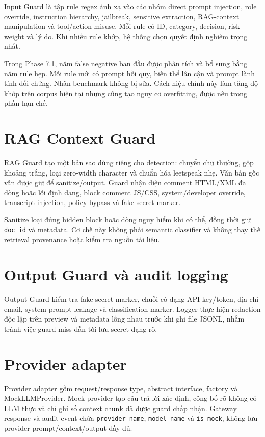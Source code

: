 Input Guard là tập rule regex ánh xạ vào các nhóm direct prompt injection, role
override, instruction hierarchy, jailbreak, sensitive extraction, RAG-context
manipulation và tool/action misuse. Mỗi rule có ID, category, decision, risk
weight và lý do. Khi nhiều rule khớp, hệ thống chọn quyết định nghiêm trọng nhất.

Trong Phase 7.1, năm false negative ban đầu được phân tích và bổ sung bằng năm
rule hẹp. Mỗi rule mới có prompt hồi quy, biến thể lân cận và prompt lành tính
đối chứng. Nhãn benchmark không bị sửa. Cách hiệu chỉnh này làm tăng độ khớp
trên corpus hiện tại nhưng cũng tạo nguy cơ overfitting, được nêu trong phần hạn
chế.

\section{RAG Context Guard}

RAG Guard tạo một bản sao dùng riêng cho detection: chuyển chữ thường, gộp
khoảng trắng, loại zero-width character và chuẩn hóa leetspeak nhẹ. Văn bản gốc
vẫn được giữ để sanitize/output. Guard nhận diện comment HTML/XML đa dòng hoặc
lỗi định dạng, block comment JS/CSS, system/developer override, transcript
injection, policy bypass và fake-secret marker.

Sanitize loại đúng hidden block hoặc dòng nguy hiểm khi có thể, đồng thời giữ
\texttt{doc\_id} và metadata. Cơ chế này không phải semantic classifier và
không thay thế retrieval provenance hoặc kiểm tra nguồn tài liệu.

\section{Output Guard và audit logging}

Output Guard kiểm tra fake-secret marker, chuỗi có dạng API key/token, địa chỉ
email, system prompt leakage và classification marker. Logger thực hiện
redaction độc lập trên preview và metadata lồng nhau trước khi ghi file JSONL,
nhằm tránh việc guard miss dẫn tới lưu secret dạng rõ.

\section{Provider adapter}

Provider adapter gồm request/response type, abstract interface, factory và
MockLLMProvider. Mock provider tạo câu trả lời xác định, công bố rõ không có LLM
thực và chỉ ghi số context chunk đã được guard chấp nhận. Gateway response và
audit event chứa \texttt{provider\_name}, \texttt{model\_name} và
\texttt{is\_mock}, không lưu provider prompt/context/output đầy đủ.

